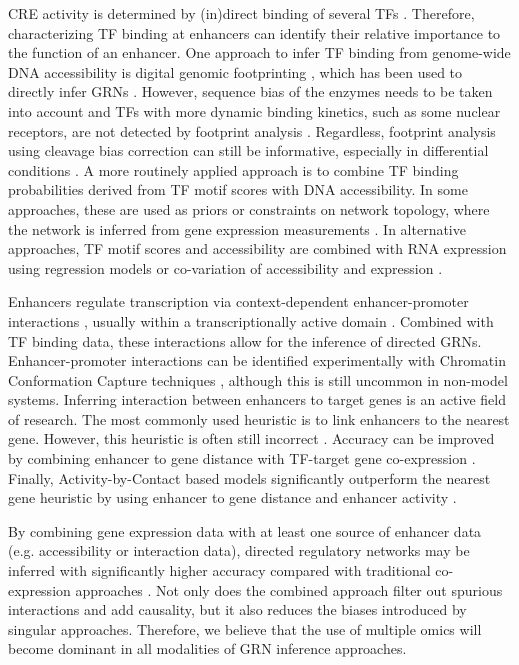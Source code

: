 CRE activity is determined by (in)direct binding of several TFs \cite{Simeone_1988,Mitchell_1989}. Therefore, characterizing TF binding at enhancers can identify their relative importance to the function of an enhancer. One approach to infer TF binding from genome-wide DNA accessibility is digital genomic footprinting \cite{Hesselberth_2009}, which has been used to directly infer GRNs \cite{Neph_2012,Neph_2012}. However, sequence bias of the enzymes needs to be taken into account and TFs with more dynamic binding kinetics, such as some nuclear receptors, are not detected by footprint analysis \cite{He_2013,Sung_2016,Sung_2014}. Regardless, footprint analysis using cleavage bias correction can still be informative, especially in differential conditions \cite{Li_2019,Bentsen_2020}. A more routinely applied approach is to combine TF binding probabilities derived from TF motif scores with DNA accessibility. In some approaches, these are used as priors or constraints on network topology, where the network is inferred from gene expression measurements \cite{Miraldi_2019,Siahpirani_2016,Sonawane_2021}. In alternative approaches, TF motif scores and accessibility are combined with RNA expression using regression models or co-variation of accessibility and expression \cite{Madsen_2017,Kamal_2021,Schmidt_2018,Xu_2020,Ghaffari_2021,Vijayabaskar_2019}.

Enhancers regulate transcription via context-dependent enhancer-promoter interactions \cite{Levine_2010}, usually within a transcriptionally active domain \cite{Nora_2012}. Combined with TF binding data, these interactions allow for the inference of directed GRNs. Enhancer-promoter interactions can be identified experimentally with Chromatin Conformation Capture techniques \cite{Dekker_2002,Lieberman_Aiden_2009,Mifsud_2015}, although this is still uncommon in non-model systems. Inferring interaction between enhancers to target genes is an active field of research. The most commonly used heuristic is to link enhancers to the nearest gene. However, this heuristic is often still incorrect \cite{Sanyal_2012,Li_2012}. Accuracy can be improved by combining enhancer to gene distance with TF-target gene co-expression \cite{Marbach_2016}. Finally, Activity-by-Contact based models significantly outperform the nearest gene heuristic by using enhancer to gene distance and enhancer activity \cite{Fulco_2019}.

By combining gene expression data with at least one source of enhancer data (e.g. accessibility or interaction data), directed regulatory networks may be inferred with significantly higher accuracy compared with traditional co-expression approaches \cite{Xu_2020,Mercatelli_2020,Glass_2013}. Not only does the combined approach filter out spurious interactions and add causality, but it also reduces the biases introduced by singular approaches. Therefore, we believe that the use of multiple omics will become dominant in all modalities of GRN inference approaches.

